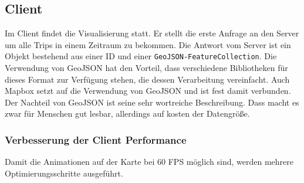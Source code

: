 \subsection{Client}
\label{ssub:client}
  Im Client findet die Visualisierung statt. Er stellt die erste Anfrage an den Server um alle Trips in einem Zeitraum zu bekommen. Die Antwort vom Server ist ein Objekt bestehend aus einer ID und einer \texttt{GeoJSON-FeatureCollection}. Die Verwendung von GeoJSON hat den Vorteil, dass verschiedene Bibliotheken für dieses Format zur Verfügung stehen, die dessen Verarbeitung vereinfacht. Auch Mapbox setzt auf die Verwendung von GeoJSON und ist fest damit verbunden. Der Nachteil von GeoJSON ist seine sehr wortreiche Beschreibung. Dass macht es zwar für Menschen gut lesbar, allerdings auf kosten der Datengröße.

  \subsubsection{Verbesserung der Client Performance}
  \label{ssub:verbesserung_der_client_performance}
    Damit die Animationen auf der Karte bei 60 FPS möglich sind, werden mehrere Optimierungsschritte ausgeführt.

